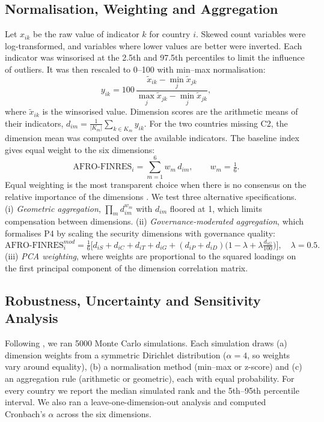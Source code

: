 \documentclass[fintech,article,submit,pdftex,moreauthors]{Definitions/mdpi}
\begin{document}
\subsection{Normalisation, Weighting and Aggregation}

Let $x_{ik}$ be the raw value of indicator $k$ for country $i$. Skewed count variables were log-transformed, and variables where lower values are better were inverted. Each indicator was winsorised at the 2.5th and 97.5th percentiles to limit the influence of outliers. It was then rescaled to 0--100 with min--max normalisation:
\begin{equation}
 y_{ik}=100\,\frac{\tilde{x}_{ik}-\min_j \tilde{x}_{jk}}{\max_j \tilde{x}_{jk}-\min_j \tilde{x}_{jk}},
\end{equation}
where $\tilde{x}_{ik}$ is the winsorised value. Dimension scores are the arithmetic means of their indicators, $d_{im}=\frac{1}{|K_m|}\sum_{k\in K_m} y_{ik}$. For the two countries missing C2, the dimension mean was computed over the available indicators. The baseline index gives equal weight to the six dimensions:
\begin{equation}
 \text{AFRO-FINRES}_i=\sum_{m=1}^{6} w_m\, d_{im},\qquad w_m=\tfrac{1}{6}.
\end{equation}
Equal weighting is the most transparent choice when there is no consensus on the relative importance of the dimensions \citep{OECD2008,Greco2018}. We test three alternative specifications. (i) \emph{Geometric aggregation}, $\prod_m d_{im}^{w_m}$ with $d_{im}$ floored at 1, which limits compensation between dimensions. (ii) \emph{Governance-moderated aggregation}, which formalises P4 by scaling the security dimensions with governance quality:
\begin{equation}
 \text{AFRO-FINRES}^{mod}_i=\tfrac{1}{6}\Big[d_{iS}+d_{iC}+d_{iT}+d_{iG}+(d_{iP}+d_{iD})\big(1-\lambda+\lambda\tfrac{d_{iG}}{100}\big)\Big],\quad \lambda=0.5.
\end{equation}
(iii) \emph{PCA weighting}, where weights are proportional to the squared loadings on the first principal component of the dimension correlation matrix.

\subsection{Robustness, Uncertainty and Sensitivity Analysis}

Following \citet{Saisana2005}, we ran 5000 Monte Carlo simulations. Each simulation draws (a) dimension weights from a symmetric Dirichlet distribution ($\alpha=4$, so weights vary around equality), (b) a normalisation method (min--max or z-score) and (c) an aggregation rule (arithmetic or geometric), each with equal probability. For every country we report the median simulated rank and the 5th--95th percentile interval. We also ran a leave-one-dimension-out analysis and computed Cronbach's $\alpha$ across the six dimensions.
\end{document}
